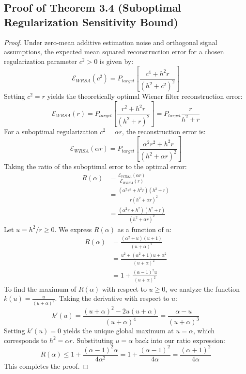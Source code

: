 \documentclass{article}
\theoremstyle{plain}
\theoremstyle{definition}
\theoremstyle{remark}
\begin{document}
\subsection{Proof of Theorem 3.4 (Suboptimal Regularization Sensitivity Bound)}
\label{app:proof_sensitivity_bound}
\begin{proof}
  Under zero-mean additive estimation noise and orthogonal signal assumptions, the expected mean squared reconstruction error for a chosen regularization parameter $c^2 > 0$ is given by:
  \begin{equation}
    \mathcal{E}_{WRSA}(c^2) = P_{target} \left[ \frac{c^4 + h^2 r}{(h^2 + c^2)^2} \right]
  \end{equation}
  Setting $c^2 = r$ yields the theoretically optimal Wiener filter reconstruction error:
  \begin{equation}
    \mathcal{E}_{WRSA}(r) = P_{target} \left[ \frac{r^2 + h^2 r}{(h^2 + r)^2} \right] = P_{target} \frac{r}{h^2 + r}
  \end{equation}
  For a suboptimal regularization $c^2 = \alpha r$, the reconstruction error is:
  \begin{equation}
    \mathcal{E}_{WRSA}(\alpha r) = P_{target} \left[ \frac{\alpha^2 r^2 + h^2 r}{(h^2 + \alpha r)^2} \right]
  \end{equation}
  Taking the ratio of the suboptimal error to the optimal error:
  \begin{align}
    R(\alpha) &= \frac{\mathcal{E}_{WRSA}(\alpha r)}{\mathcal{E}_{WRSA}(r)} \nonumber \\
    &= \frac{(\alpha^2 r^2 + h^2 r)(h^2 + r)}{r (h^2 + \alpha r)^2} \nonumber \\
    &= \frac{(\alpha^2 r + h^2)(h^2 + r)}{(h^2 + \alpha r)^2}
  \end{align}
  Let $u = h^2 / r \ge 0$. We express $R(\alpha)$ as a function of $u$:
  \begin{align}
    R(\alpha) &= \frac{(\alpha^2 + u)(u + 1)}{(u + \alpha)^2} \nonumber \\
    &= \frac{u^2 + (\alpha^2 + 1) u + \alpha^2}{(u + \alpha)^2} \nonumber \\
    &= 1 + \frac{(\alpha - 1)^2 u}{(u + \alpha)^2}
  \end{align}
  To find the maximum of $R(\alpha)$ with respect to $u \ge 0$, we analyze the function $k(u) = \frac{u}{(u + \alpha)^2}$. Taking the derivative with respect to $u$:
  \begin{equation}
    k'(u) = \frac{(u + \alpha)^2 - 2u(u + \alpha)}{(u + \alpha)^4} = \frac{\alpha - u}{(u + \alpha)^3}
  \end{equation}
  Setting $k'(u) = 0$ yields the unique global maximum at $u = \alpha$, which corresponds to $h^2 = \alpha r$. Substituting $u = \alpha$ back into our ratio expression:
  \begin{equation}
    R(\alpha) \le 1 + \frac{(\alpha - 1)^2 \alpha}{4 \alpha^2} = 1 + \frac{(\alpha - 1)^2}{4\alpha} = \frac{(\alpha + 1)^2}{4\alpha}
  \end{equation}
  This completes the proof.
\end{proof}
\end{document}
